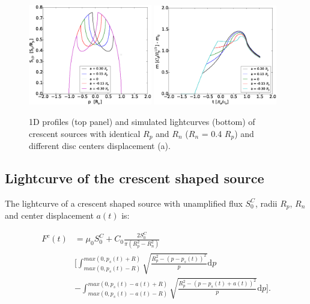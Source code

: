 \documentclass[usenatbib]{mn2e}
\begin{document}
\begin{figure}
\centering
    \includegraphics[width = 0.48\textwidth]{figures/S1D_var_a.eps}
    \includegraphics[width = 0.48\textwidth]{figures/4avar_magnification.eps}
\caption{\label{fig:a_var} 1D profiles (top panel) and simulated lightcurves 
(bottom) of crescent sources with identical $R_p$ and $R_n$ ($R_n$ = 0.4 $R_p$) and different disc centers displacement (a).}
\end{figure}


\subsection{Lightcurve of the crescent shaped source}

The lightcurve of a crescent shaped source with unamplified flux $S_0^C$, radii $R_p$, $R_n$ and center displacement $a(t)$ is:


\begin{equation}
\begin{aligned}
 F^c(t) &= \mu_0 S_0^C + C_0 \frac{2 S_0^C}{\pi \left( R_p^2 -R_n^2 \right) } \\
    &\bigg[ \int_{max(0, p_s(t) - R)}^{max(0, p_s(t) + R)} \sqrt{\frac{R_p^2 - \left( p-p_s(t) \right)^2 }{p}} \mathrm{d}p \\
    &  -  \int_{max(0, p_s(t) - a(t) - R)}^{max(0, p_s(t) -a(t) + R)} \sqrt{\frac{R_p^2 - \left( p-p_s(t) +a(t) \right)^2 }{p}} \mathrm{d}p  \bigg] .
\end{aligned}
\end{equation}
\end{document}
